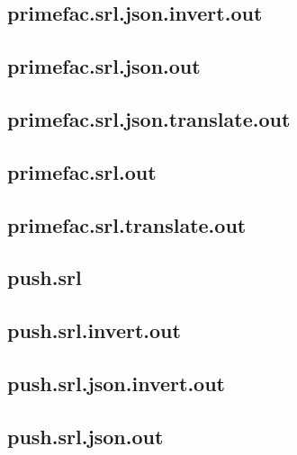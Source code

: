 \subsection{primefac.srl.json.invert.out}
\label{app:primefac_srl.json.invert.out}

\subsection{primefac.srl.json.out}
\label{app:primefac_srl.json.out}

\subsection{primefac.srl.json.translate.out}
\label{app:primefac_srl.json.translate.out}

\subsection{primefac.srl.out}
\label{app:primefac_srl.out}

\subsection{primefac.srl.translate.out}
\label{app:primefac_srl.translate.out}

\subsection{push.srl}
\label{app:push_srl}

\subsection{push.srl.invert.out}
\label{app:push_srl.invert.out}

\subsection{push.srl.json.invert.out}
\label{app:push_srl.json.invert.out}

\subsection{push.srl.json.out}
\label{app:push_srl.json.out}

